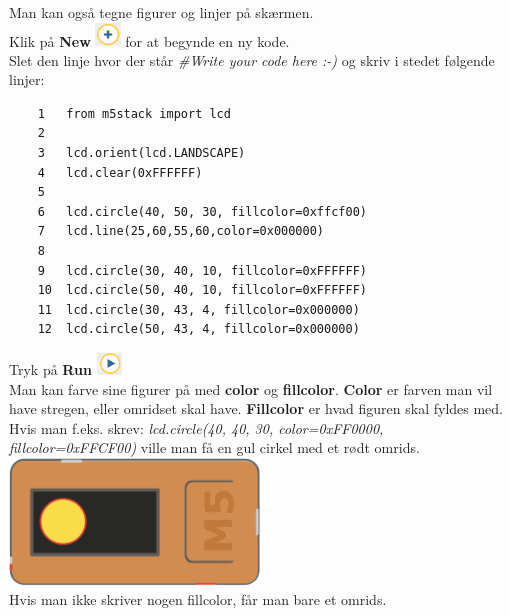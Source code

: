 \documentclass{ucph-handout}
\begin{document}
\newpage
\begin{exercisebox}[adjusted title= Tegning]
Man kan også tegne figurer og linjer på skærmen. \\
Klik på \textbf{New} \includegraphics[width=0.05\textwidth]{ikoner/new.png} for at begynde en ny kode. \\

Slet den linje hvor der står \textit{\#Write your code here :-)} og skriv i stedet følgende linjer:\\
\begin{verbatim}
    1   from m5stack import lcd
    2
    3   lcd.orient(lcd.LANDSCAPE)
    4   lcd.clear(0xFFFFFF)
    5
    6   lcd.circle(40, 50, 30, fillcolor=0xffcf00)
    7   lcd.line(25,60,55,60,color=0x000000)
    8
    9   lcd.circle(30, 40, 10, fillcolor=0xFFFFFF)
    10  lcd.circle(50, 40, 10, fillcolor=0xFFFFFF)
    11  lcd.circle(30, 43, 4, fillcolor=0x000000)
    12  lcd.circle(50, 43, 4, fillcolor=0x000000)
\end{verbatim}

Tryk på \textbf{Run} \includegraphics[width=0.05\textwidth]{ikoner/run.png}\\

Man kan farve sine figurer på med \textbf{color} og \textbf{fillcolor}. \textbf{Color} er farven man vil have stregen, eller omridset skal have. \textbf{Fillcolor} er hvad figuren skal fyldes med.\\

Hvis man f.eks. skrev: \textit{lcd.circle(40, 40, 30, color=0xFF0000, fillcolor=0xFFCF00)} ville man få en gul cirkel med et rødt omrids.\\

\includegraphics[width=0.5\textwidth]{billeder/cirkel.png}\\

Hvis man ikke skriver nogen fillcolor, får man bare et omrids.\\


\end{exercisebox}
\end{document}

